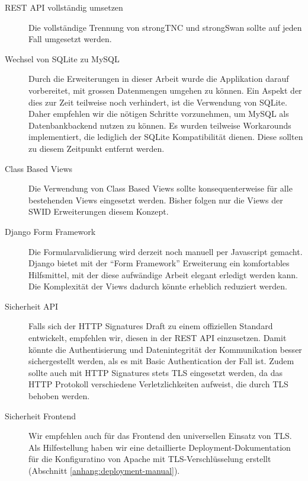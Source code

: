 \begin{description} 

	\item[REST API vollständig umsetzen] Die vollständige Trennung von strongTNC
	und strongSwan sollte auf jeden Fall umgesetzt werden.
	
	\item[Wechsel von SQLite zu MySQL] Durch die Erweiterungen in dieser Arbeit
	wurde die Applikation darauf vorbereitet, mit grossen Datenmengen umgehen zu
	können. Ein Aspekt der dies zur Zeit teilweise noch verhindert, ist die
	Verwendung von SQLite. Daher empfehlen wir die nötigen Schritte vorzunehmen, um
	MySQL als Datenbankbackend nutzen zu können. Es wurden teilweise Workarounds
	implementiert, die lediglich der SQLite Kompatibilität dienen. Diese sollten zu
	diesem Zeitpunkt entfernt werden.
	
	\item[Class Based Views] Die Verwendung von Class Based Views sollte
	konsequenterweise für alle bestehenden Views eingesetzt werden. Bisher folgen
	nur die Views der SWID Erweiterungen diesem Konzept.
	
	\item[Django Form Framework] Die Formularvalidierung wird derzeit noch manuell
	per Javascript gemacht. Django bietet mit der \enquote{Form Framework}
	Erweiterung ein komfortables Hilfsmittel, mit der diese aufwändige Arbeit
	elegant erledigt werden kann. Die Komplexität der Views dadurch könnte
	erheblich reduziert werden.
	
	\item[Sicherheit API] Falls sich der HTTP Signatures Draft zu einem offiziellen Standard entwickelt, empfehlen wir, diesen in der REST API einzusetzen. Damit könnte die Authentisierung und Datenintegrität der Kommunikation besser sichergestellt werden, als es mit Basic Authentication der Fall ist.
	Zudem sollte auch mit HTTP Signatures stets TLS eingesetzt werden, da das HTTP Protokoll verschiedene Verletzlichkeiten aufweist, die durch TLS
	behoben werden\cite{httpsecconsiderations2014}.
	
	\item[Sicherheit Frontend]
	Wir empfehlen auch für das Frontend den universellen Einsatz von TLS. Als Hilfestellung haben wir eine detaillierte Deployment-Dokumentation für die Konfiguratino von Apache mit TLS-Verschlüsselung erstellt (Abschnitt \ref{anhang:deployment-manual}).
	
\end{description}